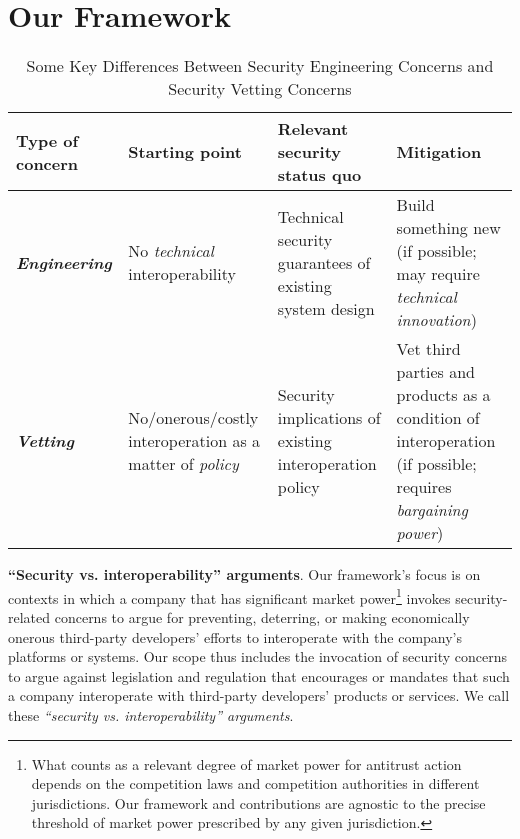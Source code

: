 \documentclass[letterpaper,twocolumn,10pt]{article}
\newcommand{\bi}[1]{\textbf{\textit{#1}}}
\newcommand{\subh}[1]{\smallskip \noindent \textbf{{#1}}.}
\renewcommand{\paragraph}[1]{\subh{#1}}
\begin{document}
\section{Our Framework}
\label{sec:framework}

\begin{table*}[ht]
\centering
\renewcommand{\arraystretch}{1.5} %
\begin{tabularx}{\textwidth}{|p{}|p{}|X|X|}

\hline
\textbf{Type of concern} & 
\textbf{Starting point} &
\textbf{Relevant security status quo} &
\textbf{Mitigation}  \\
\hline

\bi{Engineering} &
No \emph{technical} \newline interoperability &
Technical security guarantees of \newline existing system design & Build something new (if possible; may require \emph{technical innovation})  \\ 
\hline
\bi{Vetting} &
No/onerous/costly \newline interoperation as a matter of \emph{policy} &
Security implications of existing \newline interoperation policy & Vet third parties and products as a \newline condition of interoperation (if possible; requires \emph{bargaining power})  \\

\hline

\end{tabularx}

\caption{Some Key Differences Between Security Engineering Concerns and Security Vetting Concerns}
\label{tab:security_arguments}
\end{table*}

\paragraph{``Security vs. interoperability'' arguments}
Our framework's focus is on contexts in which a company that has significant market power\footnote{What counts as a relevant degree of market power for antitrust action depends on the competition laws and competition authorities in different jurisdictions. Our framework and contributions are agnostic to the precise threshold of market power prescribed by any given jurisdiction.} 
invokes security-related concerns to argue for preventing, deterring, or making economically onerous third-party developers' efforts to interoperate with the company's platforms or systems. Our scope thus includes the invocation of security concerns to argue against legislation and regulation that encourages or mandates that such a company interoperate with third-party developers' products or services. We call these \emph{``security vs. interoperability'' arguments}.
\end{document}
